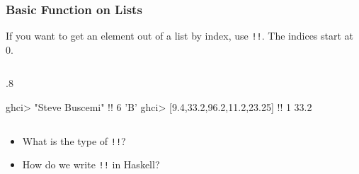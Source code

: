 \documentclass{beamer}
\newenvironment{codeblock}[1][.8]{%
\begin{columns}
\begin{column}{#1\linewidth}
\begin{exampleblock}{}}{%
\end{exampleblock}
\end{column}
\end{columns}}
\begin{document}
\begin{frame}[fragile]
\frametitle{Basic Function on Lists}

If you want to get an element out of a list by index, use \verb+!!+. The indices start at 0.

\begin{codeblock}
\begin{hcode}
ghci> "Steve Buscemi" !! 6  
'B'  
ghci> [9.4,33.2,96.2,11.2,23.25] !! 1  
33.2  
\end{hcode}
\end{codeblock}

\begin{itemize}

\item What is the type of \verb+!!+?

\item How do we write \verb+!!+ in Haskell?

\end{itemize}

\end{frame}
\end{document}
